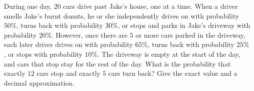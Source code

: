 During one day, $20$ cars drive past Jake's house, one at a time. When a driver smells Jake's burnt donuts, he or she independently drives on with probability $50\%$, turns back with probability $30\%$, or stops and parks in Jake's driveway with probability $20\%$. However, once there are $5$ or more cars parked in the driveway, each later driver drives on with probability $65\%$, turns back with probability $25\%$, or stops with probability $10\%$. The driveway is empty at the start of the day, and cars that stop stay for the rest of the day. What is the probability that exactly $12$ cars stop and exactly $5$ cars turn back? Give the exact value and a decimal approximation.
